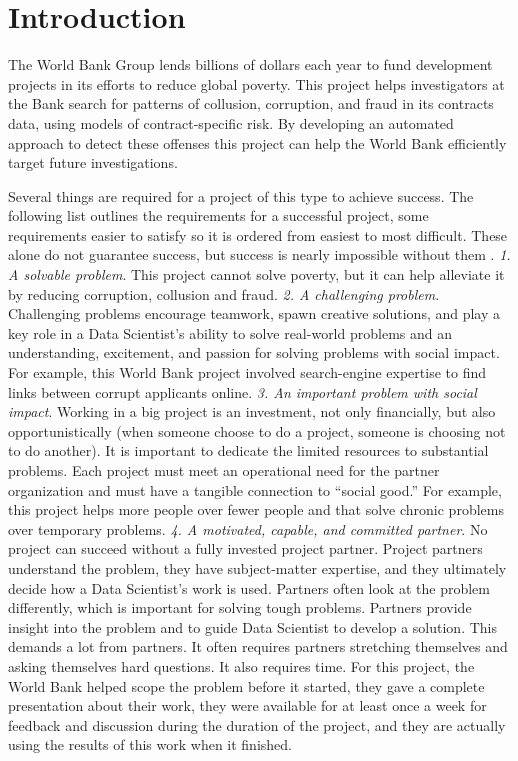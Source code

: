 \chapter{Introduction}\label{chap_intro}

The World Bank Group lends billions of dollars each year to fund development projects in its efforts to reduce global poverty. This project helps investigators at the Bank search for patterns of collusion, corruption, and fraud in its contracts data, using models of contract-specific risk. By developing an automated approach to detect these offenses this project can help the World Bank efficiently target future investigations.

Several things are required for a project of this type to achieve success. The following list outlines the requirements for a successful project, some requirements easier to satisfy so it is ordered from easiest to most difficult. These alone do not guarantee success, but success is nearly impossible without them \parencite{dssg_proj_list} \label{dssg}.   \textit{1. A solvable problem}. This project cannot solve poverty, but it can help alleviate it by reducing corruption, collusion and fraud. 
\textit{2. A challenging problem}. Challenging problems encourage teamwork, spawn creative solutions, and play a key role in a Data Scientist's ability to solve real-world problems and an understanding, excitement, and passion for solving problems with social impact. For example, this World Bank project involved  search-engine expertise to find links between corrupt applicants online. 
\textit{3. An important problem with social impact}. Working in a big project is an investment, not only financially, but also opportunistically (when someone choose to do a project, someone is choosing not to do another). It is important to dedicate the limited resources to substantial problems. Each project must meet an operational need for the partner organization and must have a tangible connection to ``social good.'' For example, this project helps more people over fewer people and that solve chronic problems over temporary problems. 
\textit{4. A motivated, capable, and committed partner}. No project can succeed without a fully invested project partner. Project partners understand the problem, they have subject-matter expertise, and they ultimately decide how a Data Scientist's work is used. Partners often look at the problem differently, which is important for solving tough problems.  Partners provide insight into the problem and to guide Data Scientist to develop a solution. This demands a lot from partners. It often requires partners stretching themselves and asking themselves hard questions. It also requires time. For this project, the World Bank helped scope the problem before it started, they gave a complete presentation about their work, they were available for at least once a week for feedback and discussion during the duration of the project, and they are actually using the results of this work when it finished. 
